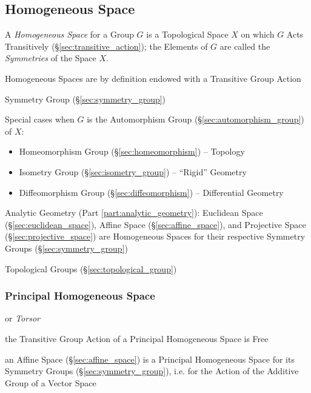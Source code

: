 \subsection{Homogeneous Space}\label{sec:homogeneous_space}

A \emph{Homogeneous Space} for a Group $G$ is a Topological Space $X$ on which
$G$ Acts Transitively (\S\ref{sec:transitive_action}); the Elements of $G$ are
called the \emph{Symmetries} of the Space $X$.

Homogeneous Spaces are by definition endowed with a Transitive Group Action

Symmetry Group (\S\ref{sec:symmetry_group})

Special cases when $G$ is the Automorphism Group
(\S\ref{sec:automorphism_group}) of $X$:
\begin{itemize}
  \item Homeomorphism Group (\S\ref{sec:homeomorphism}) -- Topology
  \item Isometry Group (\S\ref{sec:isometry_group}) -- ``Rigid'' Geometry
  \item Diffeomorphism Group (\S\ref{sec:diffeomorphism}) -- Differential
    Geometry
\end{itemize}

Analytic Geometry (Part \ref{part:analytic_geometry}): Euclidean Space
(\S\ref{sec:euclidean_space}), Affine Space (\S\ref{sec:affine_space}), and
Projective Space (\S\ref{sec:projective_space}) are Homogeneous Spaces for their
respective Symmetry Groups (\S\ref{sec:symmetry_group})

Topological Groups (\S\ref{sec:topological_group})



\subsubsection{Principal Homogeneous Space}
\label{sec:principal_homogeneous_space}

or \emph{Torsor}

the Transitive Group Action of a Principal Homogeneous Space is Free

an Affine Space (\S\ref{sec:affine_space}) is a Principal Homogeneous Space for
its Symmetry Groups (\S\ref{sec:symmetry_group}), i.e. for the Action of the
Additive Group of a Vector Space



